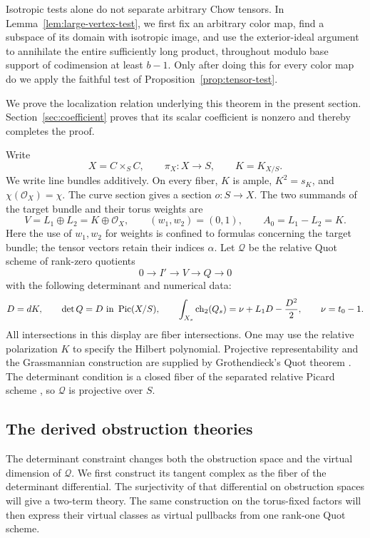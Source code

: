 Isotropic tests alone do not separate arbitrary Chow tensors.
In Lemma~\ref{lem:large-vertex-test}, we first fix an arbitrary color
map, find a subspace of its domain with isotropic image, and use the
exterior-ideal argument to annihilate the entire sufficiently long
product, throughout modulo base support of codimension at least
\(b-1\). Only after doing this for every color map do we apply the
faithful test of Proposition~\ref{prop:tensor-test}.

We prove the localization relation underlying this theorem in the present
section. Section~\ref{sec:coefficient} proves that its scalar coefficient
is nonzero and thereby completes the proof.

Write
\[
 X=C\times_S C,\qquad \pi_X:X\longrightarrow S,\qquad
 K=K_{X/S}.
\]
We write line bundles additively. On every fiber, \(K\) is ample,
\(K^2=s_K\), and \(\chi(\mathcal O_X)=\chi\).
The curve section gives a section \(o:S\to X\).
The two summands of the target bundle and their torus weights are
\begin{equation}
\label{eq:quot-target}
 V=L_1\oplus L_2=K\oplus\mathcal O_X,\qquad
 (w_1,w_2)=(0,1),\qquad A_0=L_1-L_2=K.
\end{equation}
Here the use of \(w_1,w_2\) for weights is confined to formulas concerning
the target bundle; the tensor vectors retain their indices \(\alpha\).
Let \(\mathcal Q\) be the relative Quot scheme of rank-zero quotients
\[
 0\longrightarrow I'\longrightarrow V\longrightarrow Q
 \longrightarrow0
\]
with the following determinant and numerical data:
\begin{equation}
\label{eq:quot-data}
 D=dK,\qquad
 \det Q=D\text{ in }\operatorname{Pic}(X/S),\qquad
 \int_{X_s}\operatorname{ch}_2(Q_s)=\nu+L_1D-\frac{D^2}{2},
 \qquad \nu=t_0-1.
\end{equation}
All intersections in this display are fiber intersections.
One may use the relative polarization \(K\) to specify the Hilbert
polynomial. Projective representability and the Grassmannian construction
are supplied by Grothendieck's Quot theorem
\cite[Theorem~5.1 and Section~5]{Nitsure}. The determinant condition is a closed fiber of the separated relative
Picard scheme \cite[Theorem~4.8(1)]{KleimanPicard}, so \(\mathcal Q\)
is projective over \(S\).

\subsection{The derived obstruction theories}

The determinant constraint changes both the obstruction space and the
virtual dimension of \(\mathcal Q\).  We first construct its tangent
complex as the fiber of the determinant differential.  The surjectivity
of that differential on obstruction spaces will give a two-term theory.
The same construction on the torus-fixed factors will then express their
virtual classes as virtual pullbacks from one rank-one Quot scheme.

